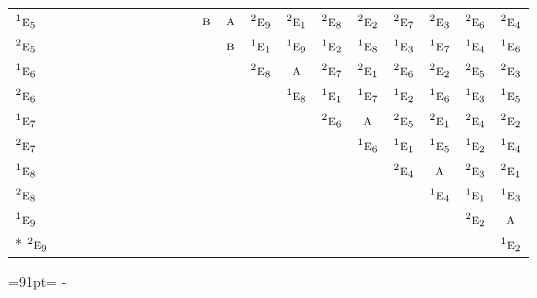 \documentclass[10pt,a4paper]{article}
\newcommand{\needspace}[1]{\par\penalty-100\begingroup\dimen0=#1\relax\dimen2=\pagegoal
  \advance\dimen2-\pagetotal\ifdim\dimen0>\dimen2\relax\ifdim\dimen2>0pt\vfil\break\fi\fi
  \endgroup}
\numberwithin{equation}{section}
\newcommand{\irr}[1]{\text{\normalfont\scshape #1}}
\newcommand{\conjpair}[1]{{}^{#1}}
\begin{document}
{\begin{longtable}{@{}lcccccccccccccccccccc@{}}
$\conjpair{1}\irr{e}_{5}$ &  &  &  &  &  &  &  &  &  &  & $\irr{b}$ & $\irr{a}$ & $\conjpair{2}\irr{e}_{9}$ & $\conjpair{2}\irr{e}_{1}$ & $\conjpair{2}\irr{e}_{8}$ & $\conjpair{2}\irr{e}_{2}$ & $\conjpair{2}\irr{e}_{7}$ & $\conjpair{2}\irr{e}_{3}$ & $\conjpair{2}\irr{e}_{6}$ & $\conjpair{2}\irr{e}_{4}$\\
$\conjpair{2}\irr{e}_{5}$ &  &  &  &  &  &  &  &  &  &  &  & $\irr{b}$ & $\conjpair{1}\irr{e}_{1}$ & $\conjpair{1}\irr{e}_{9}$ & $\conjpair{1}\irr{e}_{2}$ & $\conjpair{1}\irr{e}_{8}$ & $\conjpair{1}\irr{e}_{3}$ & $\conjpair{1}\irr{e}_{7}$ & $\conjpair{1}\irr{e}_{4}$ & $\conjpair{1}\irr{e}_{6}$\\
$\conjpair{1}\irr{e}_{6}$ &  &  &  &  &  &  &  &  &  &  &  &  & $\conjpair{2}\irr{e}_{8}$ & $\irr{a}$ & $\conjpair{2}\irr{e}_{7}$ & $\conjpair{2}\irr{e}_{1}$ & $\conjpair{2}\irr{e}_{6}$ & $\conjpair{2}\irr{e}_{2}$ & $\conjpair{2}\irr{e}_{5}$ & $\conjpair{2}\irr{e}_{3}$\\
$\conjpair{2}\irr{e}_{6}$ &  &  &  &  &  &  &  &  &  &  &  &  &  & $\conjpair{1}\irr{e}_{8}$ & $\conjpair{1}\irr{e}_{1}$ & $\conjpair{1}\irr{e}_{7}$ & $\conjpair{1}\irr{e}_{2}$ & $\conjpair{1}\irr{e}_{6}$ & $\conjpair{1}\irr{e}_{3}$ & $\conjpair{1}\irr{e}_{5}$\\
$\conjpair{1}\irr{e}_{7}$ &  &  &  &  &  &  &  &  &  &  &  &  &  &  & $\conjpair{2}\irr{e}_{6}$ & $\irr{a}$ & $\conjpair{2}\irr{e}_{5}$ & $\conjpair{2}\irr{e}_{1}$ & $\conjpair{2}\irr{e}_{4}$ & $\conjpair{2}\irr{e}_{2}$\\
$\conjpair{2}\irr{e}_{7}$ &  &  &  &  &  &  &  &  &  &  &  &  &  &  &  & $\conjpair{1}\irr{e}_{6}$ & $\conjpair{1}\irr{e}_{1}$ & $\conjpair{1}\irr{e}_{5}$ & $\conjpair{1}\irr{e}_{2}$ & $\conjpair{1}\irr{e}_{4}$\\
$\conjpair{1}\irr{e}_{8}$ &  &  &  &  &  &  &  &  &  &  &  &  &  &  &  &  & $\conjpair{2}\irr{e}_{4}$ & $\irr{a}$ & $\conjpair{2}\irr{e}_{3}$ & $\conjpair{2}\irr{e}_{1}$\\
$\conjpair{2}\irr{e}_{8}$ &  &  &  &  &  &  &  &  &  &  &  &  &  &  &  &  &  & $\conjpair{1}\irr{e}_{4}$ & $\conjpair{1}\irr{e}_{1}$ & $\conjpair{1}\irr{e}_{3}$\\
$\conjpair{1}\irr{e}_{9}$ &  &  &  &  &  &  &  &  &  &  &  &  &  &  &  &  &  &  & $\conjpair{2}\irr{e}_{2}$ & $\irr{a}$\\*
$\conjpair{2}\irr{e}_{9}$ &  &  &  &  &  &  &  &  &  &  &  &  &  &  &  &  &  &  &  & $\conjpair{1}\irr{e}_{2}$\\
\bottomrule\end{longtable}}
\needspace{91pt}
\end{document}
